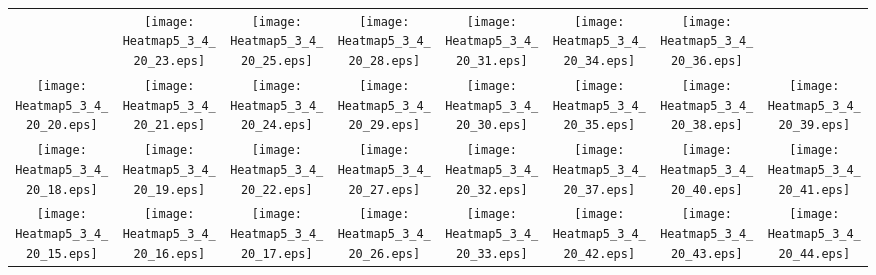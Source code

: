 \documentclass{standalone}
\begin{document}
\renewcommand{\arraystretch}{0}
\setlength{\tabcolsep}{0pt}
\begin{tabular}{ *8{c} }
 & \texttt{[image: Heatmap5\_3\_4\_20\_23.eps]} & \texttt{[image: Heatmap5\_3\_4\_20\_25.eps]} & \texttt{[image: Heatmap5\_3\_4\_20\_28.eps]} & \texttt{[image: Heatmap5\_3\_4\_20\_31.eps]} & \texttt{[image: Heatmap5\_3\_4\_20\_34.eps]} & \texttt{[image: Heatmap5\_3\_4\_20\_36.eps]} &  \\
\texttt{[image: Heatmap5\_3\_4\_20\_20.eps]} & \texttt{[image: Heatmap5\_3\_4\_20\_21.eps]} & \texttt{[image: Heatmap5\_3\_4\_20\_24.eps]} & \texttt{[image: Heatmap5\_3\_4\_20\_29.eps]} & \texttt{[image: Heatmap5\_3\_4\_20\_30.eps]} & \texttt{[image: Heatmap5\_3\_4\_20\_35.eps]} & \texttt{[image: Heatmap5\_3\_4\_20\_38.eps]} & \texttt{[image: Heatmap5\_3\_4\_20\_39.eps]} \\
\texttt{[image: Heatmap5\_3\_4\_20\_18.eps]} & \texttt{[image: Heatmap5\_3\_4\_20\_19.eps]} & \texttt{[image: Heatmap5\_3\_4\_20\_22.eps]} & \texttt{[image: Heatmap5\_3\_4\_20\_27.eps]} & \texttt{[image: Heatmap5\_3\_4\_20\_32.eps]} & \texttt{[image: Heatmap5\_3\_4\_20\_37.eps]} & \texttt{[image: Heatmap5\_3\_4\_20\_40.eps]} & \texttt{[image: Heatmap5\_3\_4\_20\_41.eps]} \\
\texttt{[image: Heatmap5\_3\_4\_20\_15.eps]} & \texttt{[image: Heatmap5\_3\_4\_20\_16.eps]} & \texttt{[image: Heatmap5\_3\_4\_20\_17.eps]} & \texttt{[image: Heatmap5\_3\_4\_20\_26.eps]} & \texttt{[image: Heatmap5\_3\_4\_20\_33.eps]} & \texttt{[image: Heatmap5\_3\_4\_20\_42.eps]} & \texttt{[image: Heatmap5\_3\_4\_20\_43.eps]} & \texttt{[image: Heatmap5\_3\_4\_20\_44.eps]} \\

\end{tabular}
\end{document}
